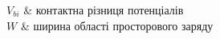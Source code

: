 \begin{longtabu}
$V_{bi}$ & контактна різниця потенціалів\\
$W$ & ширина області просторового заряду \\

\end{longtabu}
\addtocounter{table}{-1}%






